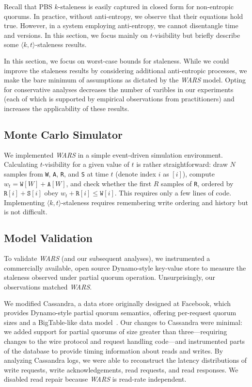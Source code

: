 \documentclass{vldb}
\begin{document}
Recall that PBS $k$-staleness is easily captured in closed form for
non-entropic quorums.  In practice, without anti-entropy, we observe
that their equations hold true.  However, in a system employing
anti-entropy, we cannot disentangle time and versions.  In this
section, we focus mainly on $t$-visibility but briefly describe some
$\langle k, t \rangle$-staleness results.

In this section, we focus on worst-case bounds for staleness.  While
we could improve the staleness results by considering additional
anti-entropic processes, we make the bare minimum of assumptions as
dictated by the \textit{WARS}  model.  Opting for conservative analyses
decreases the number of varibles in our experiments (each of which is
supported by empirical observations from practitioners) and increases
the applicability of these results.

\subsection{Monte Carlo Simulator}

We implemented \textit{WARS}  in a simple event-driven simulation environment.
Calculating $t$-visibility for a given value of $t$ is rather
straightforward: draw $N$ samples from \texttt{W}, \texttt{A},
\texttt{R}, and \texttt{S} at time $t$ (denote index $i$ as $[i]$), compute $w_t = \texttt{W}[W]+\texttt{A}[W]$, and check whether the
first $R$ samples of \texttt{R}, ordered by
$\texttt{R}[i]+\texttt{S}[i]$ obey $w_t+\texttt{R}[i] \leq
\texttt{W}[i]$.  This requires only a few lines of code.  Implementing
$\langle k, t \rangle$-staleness requires remembering write ordering
and history but is not difficult.

\subsection{Model Validation}

To validate \textit{WARS}  (and our subsequent analyses), we instrumented a
commercially available, open source Dynamo-style key-value store to
measure the staleness observed under partial quorum operation.
Unsurprisingly, our observations matched \textit{WARS}.

We modified Cassandra, a data store originally designed at Facebook,
which provides Dynamo-style partial quorum semantics, offering
per-request quorum sizes and a BigTable-like data
model~\cite{cassandra, cassandra-sigmod}.  Our changes to Cassandra were minimal:
we added support for partial quorums of size greater than
three---requiring changes to the wire protocol and request handling
code---and instrumented parts of the database to provide timing
information about reads and writes.  By analyzing Cassandra logs, we
were able to reconstruct the latency distributions of write requests,
write acknowledgements, read requests, and read responses.  We
disabled read repair because \textit{WARS} is read-rate independent.
\end{document}
